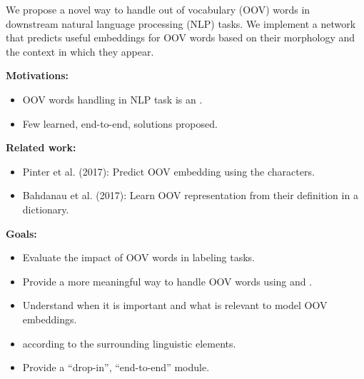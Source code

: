 We propose a novel way to handle out of vocabulary (OOV) words in downstream natural language processing (NLP) tasks. We implement a network that predicts useful embeddings for OOV words based on their morphology and the context in which they appear.

\vspace{5mm}
\textbf{Motivations:}
\begin{itemize}
  \item OOV words handling in NLP task is an .
  \item Few learned, end-to-end, solutions proposed.
\end{itemize}

\vspace{5mm}
\textbf{Related work:}
\begin{itemize}
  \item Pinter et al. (2017): Predict OOV embedding using the characters.
  \item Bahdanau et al. (2017): Learn OOV representation from their definition in a dictionary.
\end{itemize}

\vspace{0mm}
\textbf{Goals:}
\begin{itemize}
  \item Evaluate the impact of OOV words in labeling tasks.
  \item Provide a more meaningful way to handle OOV words using  and .
  \item Understand when it is important and what is relevant to model OOV embeddings.
  \item {} according to the surrounding linguistic elements.
  \item Provide a ``drop-in'', ``end-to-end'' module.
\end{itemize}